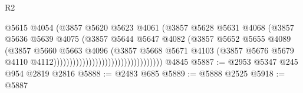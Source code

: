 \begin{lexlean}{R2}
\begin{coremodule}
                                                        @5615
                                                        @4054
                                                        (@3857
                                                          @5620
                                                          @5623
                                                          @4061
                                                          (@3857
                                                            @5628
                                                            @5631
                                                            @4068
                                                            (@3857
                                                              @5636
                                                              @5639
                                                              @4075
                                                              (@3857
                                                                @5644
                                                                @5647
                                                                @4082
                                                                (@3857
                                                                  @5652
                                                                  @5655
                                                                  @4089
                                                                  (@3857
                                                                    @5660
                                                                    @5663
                                                                    @4096
                                                                    (@3857
                                                                      @5668
                                                                      @5671
                                                                      @4103
                                                                      (@3857
                                                                        @5676
                                                                        @5679
                                                                        @4110
                                                                        @4112))))))))))))))))))))))))))))))))))
    @4845
@5887 := @2953 @5347 @245 @954 @2819 @2816
@5888 := @2483 @685
@5889 := @5888 @2525
@5918 := @5887

\end{coremodule}
\end{lexlean}
